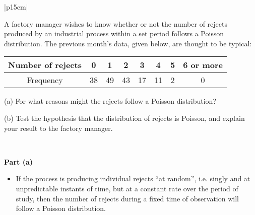 \documentclass[a4paper,12pt]{article}
\begin{document}
	\begin{table}[ht!]
		
		\centering
		
		\begin{tabular}{|p{15cm}|}
			
			\hline 
			
			\large A factory manager wishes to know whether or not the number of rejects produced by an
			industrial process within a set period follows a Poisson distribution. The previous month’s
			data, given below, are thought to be typical:
			\begin{center}
				\begin{tabular}{|c|c|c|c|c|c|c|c|} \hline
					Number of rejects & 0 & 1 & 2 & 3 & 4 & 5 & 6 or more\\ \hline
					Frequency & 38 & 49 & 43 & 17 & 11 & 2 & 0 \\ \hline
				\end{tabular}
			\end{center}
			\large 
			
			(a) For what reasons might the rejects follow a Poisson distribution?
			
			(b) Test the hypothesis that the distribution of rejects is Poisson, and explain your result to
			the factory manager.
			
			\\ \hline
			
		\end{tabular}
		
	\end{table}
	
	\large 
	\noindent \textbf{Part (a)}
	\begin{itemize}
		\item If the process is producing individual rejects ``at random”, i.e. singly and
		at unpredictable instants of time, but at a constant rate over the period
		of study, then the number of rejects during a fixed time of observation will
		follow a Poisson distribution.
	\end{itemize}
	
\end{document}
